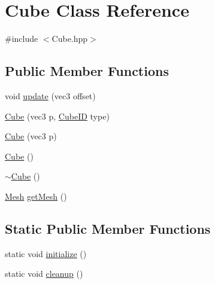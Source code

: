 \hypertarget{classCube}{}\section{Cube Class Reference}
\label{classCube}


{\ttfamily \#include $<$Cube.\+hpp$>$}

\subsection*{Public Member Functions}
\begin{DoxyCompactItemize}
\item 
void \mbox{\hyperlink{classCube_a038c53e0df559a029e9558a7f4b16e56}{update}} (vec3 offset)
\item 
\mbox{\hyperlink{classCube_a1609058c502ef5aa5d162809d156826b}{Cube}} (vec3 p, \mbox{\hyperlink{Cube_8hpp_ae2a13060ddab6f6437cc4d66a1f7c370}{Cube\+ID}} type)
\item 
\mbox{\hyperlink{classCube_a8ac9a092c5f71dd72671e83d406474aa}{Cube}} (vec3 p)
\item 
\mbox{\hyperlink{classCube_a06f3d86fb63e3aad08623610aa3c17b4}{Cube}} ()
\item 
\mbox{\hyperlink{classCube_aa814e979cecb8c451fdb332ded2cea1e}{$\sim$\+Cube}} ()
\item 
\mbox{\hyperlink{structMesh}{Mesh}} \mbox{\hyperlink{classCube_a16590bea0a2e21a9a068d9f17a5f9c59}{get\+Mesh}} ()
\end{DoxyCompactItemize}
\subsection*{Static Public Member Functions}
\begin{DoxyCompactItemize}
\item 
static void \mbox{\hyperlink{classCube_a612b349fc162d1c59dc8c45bcc33f93b}{initialize}} ()
\item 
static void \mbox{\hyperlink{classCube_aacf58e77463b0a26b81c141aa036af08}{cleanup}} ()
\end{DoxyCompactItemize}
